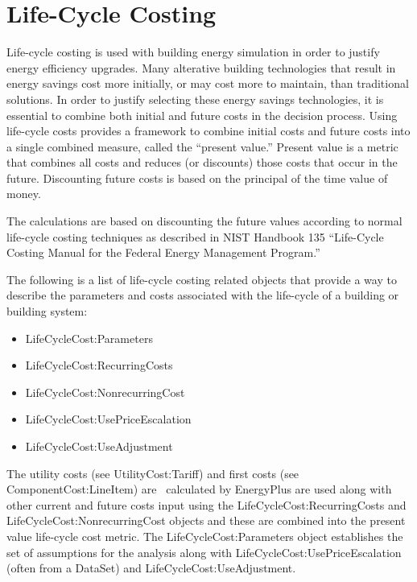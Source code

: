 \section{Life-Cycle Costing}\label{life-cycle-costing}

Life-cycle costing is used with building energy simulation in order to justify energy efficiency upgrades. Many alterative building technologies that result in energy savings cost more initially, or may cost more to maintain, than traditional solutions. In order to justify selecting these energy savings technologies, it is essential to combine both initial and future costs in the decision process. Using life-cycle costs provides a framework to combine initial costs and future costs into a single combined measure, called the ``present value.'' Present value is a metric that combines all costs and reduces (or discounts) those costs that occur in the future. Discounting future costs is based on the principal of the time value of money.

The calculations are based on discounting the future values according to normal life-cycle costing techniques as described in NIST Handbook 135 ``Life-Cycle Costing Manual for the Federal Energy Management Program.''

The following is a list of life-cycle costing related objects that provide a way to describe the parameters and costs associated with the life-cycle of a building or building system:

\begin{itemize}
\item
  LifeCycleCost:Parameters
\item
  LifeCycleCost:RecurringCosts
\item
  LifeCycleCost:NonrecurringCost
\item
  LifeCycleCost:UsePriceEscalation
\item
  LifeCycleCost:UseAdjustment
\end{itemize}

The utility costs (see UtilityCost:Tariff) and first costs (see ComponentCost:LineItem) are~ calculated by EnergyPlus are used along with other current and future costs input using the LifeCycleCost:RecurringCosts and LifeCycleCost:NonrecurringCost objects and these are combined into the present value life-cycle cost metric. The LifeCycleCost:Parameters object establishes the set of assumptions for the analysis along with LifeCycleCost:UsePriceEscalation (often from a DataSet) and LifeCycleCost:UseAdjustment.

